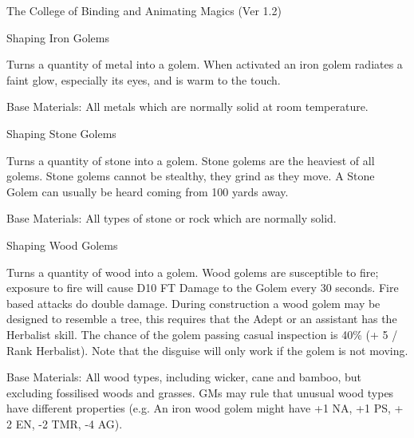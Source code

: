 \begin{Chapter}{The College of Binding and Animating Magics (Ver 1.2)}
\begin{ritual}[R-5]{Shaping Iron Golems}
\begin{effects}
Turns a quantity of metal into a golem.  When activated an iron golem
radiates a faint glow, especially its eyes, and is warm to the touch.

Base Materials: All metals which are normally solid at room temperature.
\end{effects}
\end{ritual}

\begin{ritual}[R-6]{Shaping Stone Golems}
\materialcost{500 sp}
\begin{effects}
Turns a quantity of stone into a golem.  Stone golems are the heaviest
of all golems. Stone golems cannot be stealthy, they grind as they
move. A Stone Golem can usually be heard coming from 100 yards away.

Base Materials: All types of stone or rock which are normally solid.
\end{effects}
\end{ritual}

\begin{ritual}[R-7]{Shaping Wood Golems}
\materialcost{100 sp}
\begin{effects}
Turns a quantity of wood into a golem.  Wood golems are susceptible to
fire; exposure to fire will cause D10 FT Damage to the Golem every 30
seconds.  Fire based attacks do double damage.  During construction a
wood golem may be designed to resemble a tree, this requires that the
Adept or an assistant has the Herbalist skill.  The chance of the
golem passing casual inspection is 40\% (+ 5 / Rank Herbalist). Note
that the disguise will only work if the golem is not moving.

Base Materials: All wood types, including wicker, cane and bamboo, but
excluding fossilised woods and grasses.  GMs may rule that unusual
wood types have different properties (e.g. An iron wood golem might
have +1 NA, +1 PS, + 2 EN, -2 TMR, -4 AG).
\end{effects}
\end{ritual}



\end{Chapter}

